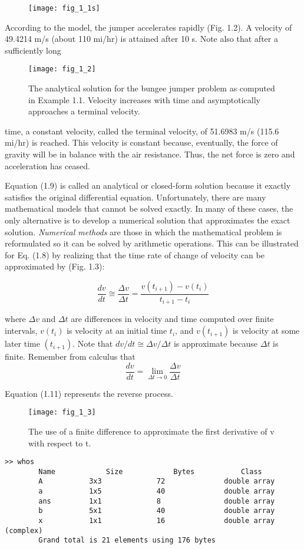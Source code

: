 \documentclass[../main.tex]{subfiles}
\begin{document}
\begin{figure}[H]
	\centering
	\texttt{[image: fig\_1\_1s]}
   \label{fig:fig_1_1s}
\end{figure}



According to the model, the jumper accelerates rapidly (Fig. 1.2). A velocity of
49.4214 m/s (about 110 mi/hr) is attained after 10 s. Note also that after a sufficiently long

\begin{figure}[H]
	\centering
	\texttt{[image: fig\_1\_2]}
   \caption{\textsf{The analytical solution for the bungee jumper problem as computed in Example 1.1. Velocity
increases with time and asymptotically approaches a terminal velocity.}}
   \label{fig:fig_1_2}
\end{figure}

time, a constant velocity, called the terminal velocity, of 51.6983 m/s (115.6 mi/hr) is
reached. This velocity is constant because, eventually, the force of gravity will be in balance with the air resistance. Thus, the net force is zero and acceleration has ceased.


Equation (1.9) is called an analytical or closed-form solution because it exactly satisfies the original differential equation. Unfortunately, there are many mathematical models
that cannot be solved exactly. In many of these cases, the only alternative is to develop a
numerical solution that approximates the exact solution.
\textit{Numerical methods} are those in which the mathematical problem is reformulated so it
can be solved by arithmetic operations. This can be illustrated for Eq. (1.8) by realizing that
the time rate of change of velocity can be approximated by (Fig. 1.3):

\begin{equation}
\tag{1.11}
\dfrac{dv}{dt}\cong\dfrac{\Delta v}{\Delta t} = \dfrac{v(t_{i+1})-v(t_i)}{t_{i+1}-t_i}
\end{equation}

where $\Delta v$ and $\Delta t$ are differences in velocity and time computed over finite intervals, $v(t_i)$
is velocity at an initial time $t_i$, and $v(t_{i+1})$ is velocity at some later time $(t_{i+1})$. Note that
$dv/dt \cong \Delta v / \Delta t$ is approximate because $ \Delta t$ is finite. Remember from calculus that
$$
\dfrac{dv}{dt} = \lim_{\Delta t\to 0} \dfrac{\Delta v}{ \Delta t}
$$

Equation (1.11) represents the reverse process.

\begin{figure}[H]
	\centering
	\texttt{[image: fig\_1\_3]}
   \caption{\textsf{The use of a finite difference to approximate the first derivative of v with respect to t.}}
   \label{fig:fig_1_3}
\end{figure}

\begin{lstlisting}[numbers=none]
	>> whos
		Name			Size			Bytes			Class
		A			3x3 			72 				double array
		a			1x5 			40 				double array
		ans			1x1 			8 				double array
		b			5x1 			40 				double array
		x			1x1 			16 				double array (complex)
		Grand total is 21 elements using 176 bytes
\end{lstlisting}
\end{document}
